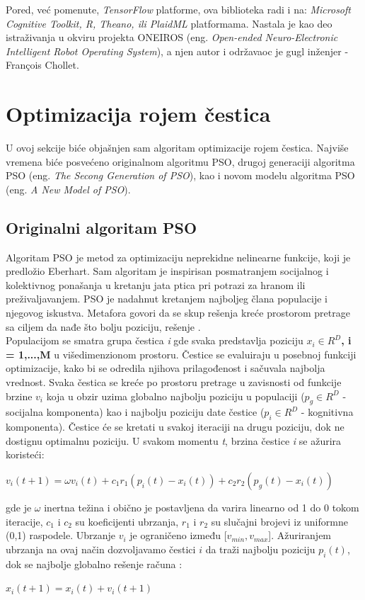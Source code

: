 \documentclass[a4paper]{article}
\begin{document}
Pored, već pomenute, \textit{TensorFlow} platforme, ova biblioteka radi i na: \textit{Microsoft Cognitive Toolkit, R, Theano, ili PlaidML} platformama. 
Nastala je kao deo istraživanja u okviru projekta ONEIROS (eng. \emph{Open-ended Neuro-Electronic Intelligent Robot Operating System}), 
a njen autor i održavaoc je gugl inženjer -  François Chollet.

\section{Optimizacija rojem čestica}
\label{subsec:pso}
U ovoj sekcije biće objašnjen sam algoritam optimizacije rojem čestica. Najviše vremena biće posvećeno originalnom algoritmu PSO, drugoj generaciji algoritma 
PSO (eng. \textit{The Secong Generation of PSO}), kao i novom modelu algoritma PSO (eng. \textit{A New Model of PSO}).


\subsection{Originalni algoritam PSO}
\label{subsec:opso}
Algoritam PSO je metod za optimizaciju neprekidne nelinearne funkcije, koji je predložio Eberhart.
Sam algoritam je inspirisan posmatranjem socijalnog i kolektivnog ponašanja u kretanju jata ptica pri potrazi za hranom ili preživaljavanjem.
PSO je nadahnut kretanjem najboljeg člana populacije i njegovog iskustva. Metafora govori da se skup rešenja kreće prostorom pretrage 
sa ciljem da nađe što bolju poziciju, rešenje \cite{hindawi}.
\\
Populacijom se smatra grupa čestica \textit{i} gde svaka predstavlja poziciju \textbf{\textbf{$x_i \in R^D$, i = 1,...,M}} u višedimenzionom prostoru.
Čestice se evaluiraju u posebnoj funkciji optimizacije, kako bi se odredila njihova prilagođenost i sačuvala najbolja vrednost. Svaka čestica se kreće po
prostoru pretrage u zavisnosti od funkcije brzine \textbf{$v_i$} koja u obzir uzima globalno najbolju poziciju u populaciji ($p_g \in R^D$ - socijalna
komponenta) kao i najbolju poziciju date čestice ($p_i \in R^D$ - kognitivna komponenta). Čestice će se kretati u svakoj iteraciji na drugu poziciju,
dok ne dostignu optimalnu poziciju. U svakom momentu \textit{t}, brzina čestice \textit{i} se ažurira koristeći: 
\begin{center}
\textbf\textit{$v_i(t+1) = \omega v_i(t) + c_1 r_1(p_i (t) - x_i (t)) + c_2 r_2 (p_g (t) - x_i (t))$}
\end{center}
gde je $\omega$ inertna težina i obično je postavljena da varira linearno od 1 do 0 tokom iteracije, $c_1$ i $c_2$ su koeficijenti ubrzanja, $r_1$ i $r_2$
su slučajni brojevi iz uniformne (0,1) raspodele. Ubrzanje \textbf{$v_i$} je ograničeno između [$v_{min}, v_{max}$]. Ažuriranjem ubrzanja na ovaj 
način dozvoljavamo čestici $i$ da traži najbolju poziciju \textbf{$p_i(t)$}, dok se najbolje globalno rešenje računa \cite{hindawi}:
\begin{center}
\textbf\textit{$x_i(t+1) = x_i(t) + v_i(t+1)$}
\end{center} 
\end{document}
